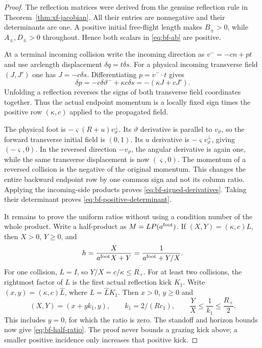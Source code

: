 \begin{proof}
The reflection matrices were derived from the genuine reflection rule
in Theorem~\ref{thm:xf-jacobian}.  All their entries are nonnegative
and their determinants are one.  A positive initial free-flight
length makes $B_\pm>0$, while $A_\pm,D_\pm>0$ throughout.  Hence
both scalars in \eqref{eq:bf-ab} are positive.

At a terminal incoming collision write the incoming direction as
$v^-=-cn+pt$ and use arclength displacement $\delta q=t\delta s$.
For a physical incoming transverse field $(J,J')$ one has
$J=-c\delta s$.  Differentiating $p=v^-\cdot t$ gives
\[
 \delta p=-c\delta\vartheta^-+\kappa c\delta s
          =-(\kappa J+cJ').
\]
Unfolding a reflection reverses the signs of both transverse field
coordinates together.  Thus the actual endpoint momentum is a
locally fixed sign times the positive row $(\kappa,c)$ applied to
the propagated field.

The physical foot is $-\varsigma(R+u)v_\vartheta^\perp$.  Its
$\vartheta$ derivative is parallel to $v_\vartheta$, so the forward
transverse initial field is $(0,1)$.  Its $u$ derivative is
$-\varsigma v_\vartheta^\perp$, giving $(-\varsigma,0)$.
In the reversed direction $-v_\vartheta$, the angular derivative
is again one, while the same transverse displacement is now
$(\varsigma,0)$.  The momentum of a reversed collision is the
negative of the original momentum.  This changes the entire
backward endpoint row by one common sign and not its column ratio.
Applying the incoming-side products proves
\eqref{eq:bf-signed-derivatives}.  Taking their determinant proves
\eqref{eq:bf-positive-determinant}.

It remains to prove the uniform ratios without using a condition
number of the whole product.  Write a half-product as
$M=L P(a^{\rm foot})$.  If
$(X,Y)=(\kappa,c)L$, then $X>0$, $Y\ge0$, and
\[
 h=\frac{X}{a^{\rm foot}X+Y}
       =\frac1{a^{\rm foot}+Y/X}.
\]
For one collision, $L=I$, so $Y/X=c/\kappa\le R_+$.
For at least two collisions, the rightmost factor of $L$ is the
first actual reflection kick $K_1$.  Write
$(x,y)=(\kappa,c)\widehat L$, where $L=\widehat L K_1$.
Then $x>0$, $y\ge0$ and
\[
 (X,Y)=(x+y k_1,y),\qquad k_1=2/(Rc_1),\qquad
 \frac YX\le\frac1{k_1}\le\frac{R_+}{2}.
\]
This includes $y=0$, for which the ratio is zero.  The standoff
and horizon bounds now give \eqref{eq:bf-half-ratio}.  The proof
never bounds a grazing kick above; a smaller positive incidence
only increases that positive kick.
\end{proof}

